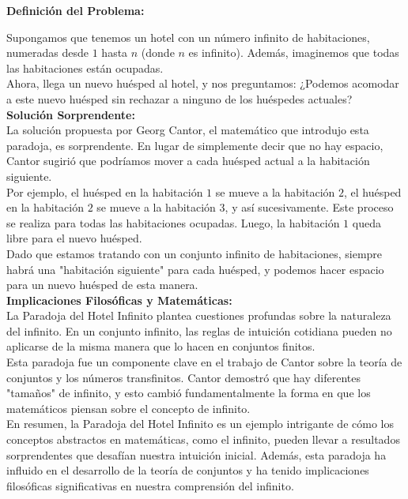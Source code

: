 
\noindent \textbf{Definición del Problema:}

\noindent Supongamos que tenemos un hotel con un número infinito de habitaciones, numeradas desde $1$ hasta $n$ (donde $n$ es infinito). Además, imaginemos que todas las habitaciones están ocupadas.\\

\noindent Ahora, llega un nuevo huésped al hotel, y nos preguntamos: ¿Podemos acomodar a este nuevo huésped sin rechazar a ninguno de los huéspedes actuales?\\

\noindent \textbf{Solución Sorprendente:} \\

\noindent La solución propuesta por Georg Cantor, el matemático que introdujo esta paradoja, es sorprendente. En lugar de simplemente decir que no hay espacio, Cantor sugirió que podríamos mover a cada huésped actual a la habitación siguiente.\\

\noindent Por ejemplo, el huésped en la habitación $1$ se mueve a la habitación $2$, el huésped en la habitación $2$ se mueve a la habitación $3$, y así sucesivamente. Este proceso se realiza para todas las habitaciones ocupadas. Luego, la habitación $1$ queda libre para el nuevo huésped.\\

\noindent Dado que estamos tratando con un conjunto infinito de habitaciones, siempre habrá una "habitación siguiente" para cada huésped, y podemos hacer espacio para un nuevo huésped de esta manera. \\

\noindent \textbf{Implicaciones Filosóficas y Matemáticas:} \\

\noindent La Paradoja del Hotel Infinito plantea cuestiones profundas sobre la naturaleza del infinito. En un conjunto infinito, las reglas de intuición cotidiana pueden no aplicarse de la misma manera que lo hacen en conjuntos finitos. \\

\noindent Esta paradoja fue un componente clave en el trabajo de Cantor sobre la teoría de conjuntos y los números transfinitos. Cantor demostró que hay diferentes "tamaños" de infinito, y esto cambió fundamentalmente la forma en que los matemáticos piensan sobre el concepto de infinito.\\

\noindent En resumen, la Paradoja del Hotel Infinito es un ejemplo intrigante de cómo los conceptos abstractos en matemáticas, como el infinito, pueden llevar a resultados sorprendentes que desafían nuestra intuición inicial. Además, esta paradoja ha influido en el desarrollo de la teoría de conjuntos y ha tenido implicaciones filosóficas significativas en nuestra comprensión del infinito. \\
